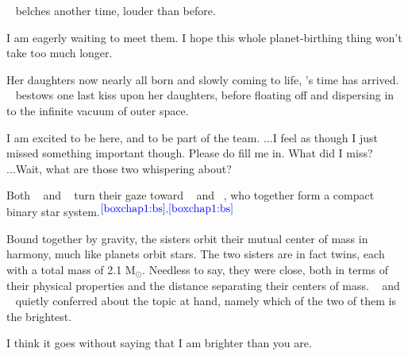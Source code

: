 \documentclass[main.tex]{subfiles}
\begin{document}
\par \nar \rmelectra~ belches another time, louder than before.

\par \Electra I am eagerly waiting to meet them.  I hope this whole planet-birthing thing won't take too much longer.


\par \nar Her daughters now nearly all born and slowly coming to life, \rmpleione's time has arrived. \rmpleione~ bestows one last kiss upon her daughters, before floating off and dispersing in to the infinite vacuum of outer space.

\par \Electra I am excited to be here, and to be part of the team. ...I feel as though I just missed something important though.  Please do fill me in.  What did I miss?  ...Wait, what are those two whispering about?

\par \nar Both \rmmaia~ and \rmelectra~ turn their gaze toward \rmtaygete~ and \rmalcyone~, who together form a compact binary star system.$^{\textcolor{blue}{{\ref{boxchap1:bs}},\textcolor{blue}{\ref{boxchap1:bs}}}}$

\par \nar Bound together by gravity, the sisters orbit their mutual center of mass in harmony, much like planets orbit stars.  The two sisters are in fact twins, each with a total mass of 2.1 M$_{\odot}$.  Needless to say, they were close, both in terms of their physical properties and the distance separating their centers of mass.  \rmtaygete~ and \rmalcyone~ quietly conferred about the topic at hand, namely which of the two of them is the brightest.


\par \Taygete I think it goes without saying that I am brighter than you are.
\end{document}
